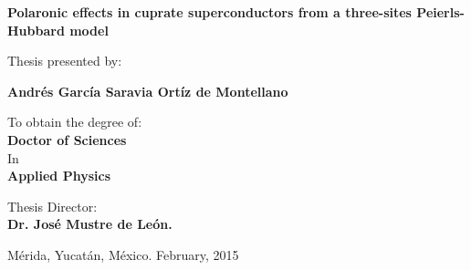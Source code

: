 \bs\bs\bs\bs
\begin{center}
  {\large \bf \bs \bf 
    \hspace{-2.8cm}
    \textsf{Polaronic effects in cuprate superconductors from a three-sites Peierls-Hubbard model}}
\end{center}
\bs\bs\bs
\begin{center}
  {\large 
    \hspace{-2.8cm}
    \textsf{Thesis presented by:}}
\end{center}
\bs\bs
\begin{center}
  {\large \bf 
    \hspace{-2.8cm}
    \textsf{Andrés García Saravia Ortíz de Montellano}} 
\end{center}
\bs
\begin{center} 
  {\large 
    \hspace{-2.8cm}
    \textsf{To obtain the degree of:}} \\ 
  \bs \smallskip 
  {\large \bf 
    \hspace{-2.8cm}
    \textsf{Doctor of Sciences}}\\ 
  \bs 
  {\large 
    \hspace{-2.8cm}
    \textsf{In}} \\
  \bs
  {\bf \large 
    \hspace{-2.8cm}
    \textsf{Applied Physics}}
\end{center}
\bs\bs\bs
\begin{center}
  \large{\hspace{-2.8cm}
    \textsf{Thesis Director: \\
      \smallskip 
      \hspace{-2.8cm}
      \textbf{Dr. José Mustre de León.}}} \\
\end{center}
\bs\bs\bs\bs\bs\bs\bs
\begin{center}
  {\large 
    \hspace{-2.8cm}
    \textsf{Mérida, Yucatán, México.
      \hspace{5.3cm} February, 2015}}
\end{center}
